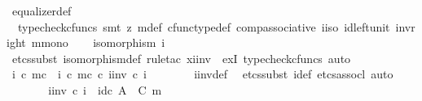 \begin{isabellebody}
\ equalizer{\isacharunderscore}{\kern0pt}def\isanewline
\ \ \ \ \isamarkupfalse%
\ {\isacharparenleft}{\kern0pt}{\isacharminus}{\kern0pt}{\isacharcomma}{\kern0pt}\ typecheck{\isacharunderscore}{\kern0pt}cfuncs{\isacharcomma}{\kern0pt}\ smt\ {\isacharparenleft}{\kern0pt}z{}{\isacharparenright}{\kern0pt}\ {\isasymchi}m{\isacharunderscore}{\kern0pt}def\ cfunc{\isacharunderscore}{\kern0pt}type{\isacharunderscore}{\kern0pt}def\ comp{\isacharunderscore}{\kern0pt}associative{}\ i{\isacharunderscore}{\kern0pt}iso\ id{\isacharunderscore}{\kern0pt}left{\isacharunderscore}{\kern0pt}unit{}\ inv{\isacharunderscore}{\kern0pt}right\ m{\isacharunderscore}{\kern0pt}mono{\isacharparenright}{\kern0pt}\isanewline
\isanewline
\ \ \isamarkupfalse%
\ {\isachardoublequoteopen}isomorphism\ i{\isacharprime}{\kern0pt}{\isachardoublequoteclose}\isanewline
\ \ \isamarkupfalse%
\ {\isacharparenleft}{\kern0pt}etcs{\isacharunderscore}{\kern0pt}subst\ isomorphism{\isacharunderscore}{\kern0pt}def{}{\isacharcomma}{\kern0pt}\ rule{\isacharunderscore}{\kern0pt}tac\ x{\isacharequal}{\kern0pt}{\isachardoublequoteopen}i{\isacharprime}{\kern0pt}{\isacharunderscore}{\kern0pt}inv{\isachardoublequoteclose}\ \ exI{\isacharcomma}{\kern0pt}\ typecheck{\isacharunderscore}{\kern0pt}cfuncs{\isacharcomma}{\kern0pt}\ auto{\isacharparenright}{\kern0pt}\isanewline
\ \ \ \ \isamarkupfalse%
\ {\isachardoublequoteopen}i\ {\isasymcirc}\isactrlsub c\ m\isactrlsup c\ {\isacharequal}{\kern0pt}\ {\isacharparenleft}{\kern0pt}i\ {\isasymcirc}\isactrlsub c\ m\isactrlsup c{\isacharparenright}{\kern0pt}\ {\isasymcirc}\isactrlsub c\ i{\isacharprime}{\kern0pt}{\isacharunderscore}{\kern0pt}inv\ {\isasymcirc}\isactrlsub c\ i{\isacharprime}{\kern0pt}{\isachardoublequoteclose}\isanewline
\ \ \ \ \ \ \isamarkupfalse%
\ i{\isacharprime}{\kern0pt}{\isacharunderscore}{\kern0pt}inv{\isacharunderscore}{\kern0pt}def\ \isamarkupfalse%
\ {\isacharparenleft}{\kern0pt}etcs{\isacharunderscore}{\kern0pt}subst\ i{\isacharprime}{\kern0pt}{\isacharunderscore}{\kern0pt}def{\isacharcomma}{\kern0pt}\ etcs{\isacharunderscore}{\kern0pt}assocl{\isacharcomma}{\kern0pt}\ auto{\isacharparenright}{\kern0pt}\isanewline
\ \ \ \ \isamarkupfalse%
\ \isamarkupfalse%
\ {\isachardoublequoteopen}i{\isacharprime}{\kern0pt}{\isacharunderscore}{\kern0pt}inv\ {\isasymcirc}\isactrlsub c\ i{\isacharprime}{\kern0pt}\ {\isacharequal}{\kern0pt}\ id\isactrlsub c\ {\isacharparenleft}{\kern0pt}A\ {\isasymsetminus}\ {\isacharparenleft}{\kern0pt}C{\isacharcomma}{\kern0pt}\ m{\isacharparenright}{\kern0pt}{\isacharparenright}{\kern0pt}{\isachardoublequoteclose}\isanewline

\end{isabellebody}
